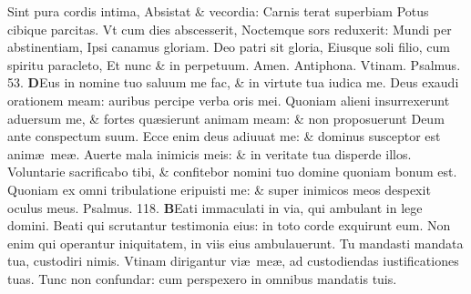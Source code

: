\documentclass[a5paper,10pt]{book}
\def\ae{æ}
\begin{document}
\begin{multicols*}{2}
\newline \color{red} S\color{black}int pura cordis intima, Absistat \& vecordia: Carnis terat superbiam Potus cibique parcitas.
\newline \color{red} V\color{black}t cum dies abscesserit, Noctemque sors reduxerit: Mundi per abstinentiam, Ipsi canamus gloriam.
\newline \color{red} D\color{black}eo patri sit gloria, Eiusque soli filio, cum spiritu paracleto, Et nunc \& in perpetuum. Amen.
\newline \color{red} Antiphona. \color{black} Vtinam. \color{red} Psalmus. \hypertarget{ps53}{53.} \color{black}
\vspace{-.25em}
\lettrine[lines=2]{\bfseries D}{}Eus in nomine tuo saluum me fac, \& in virtute tua iudica me.
\newline \color{red} D\color{black}eus exaudi orationem meam: auribus percipe verba oris mei.
\newline \color{red} Q\color{black}uoniam alieni insurrexerunt aduersum me, \& fortes qu\ae sierunt animam meam: \& non proposuerunt Deum ante conspectum suum.
\newline \color{red} E\color{black}cce enim deus adiuuat me: \& dominus susceptor est anim\ae \ me\ae .
\newline \color{red} A\color{black}uerte mala inimicis meis: \& in veritate tua disperde illos.
\newline \color{red} V\color{black}oluntarie sacrificabo tibi, \& confitebor nomini tuo domine quoniam bonum est.
\newline \color{red} Q\color{black}uoniam ex omni tribulatione eripuisti me: \& super inimicos meos despexit oculus meus. \quad \color{red} Psalmus. \hypertarget{ps118.1}{118.} \color{black}
\vspace{-.25em}
\lettrine[lines=2]{\bfseries \color{red} B}{}Eati immaculati in via, qui ambulant in lege domini.
\newline \color{red} B\color{black}eati qui scrutantur testimonia eius: in toto corde exquirunt eum.
\newline \color{red} N\color{black}on enim qui operantur iniquitatem, in viis eius ambulauerunt.
\newline \color{red} T\color{black}u mandasti mandata tua, custodiri nimis.
\newline \color{red} V\color{black}tinam dirigantur vi\ae \ me\ae , ad custodiendas iustificationes tuas.
\newline \color{red} T\color{black}unc non confundar: cum perspexero in omnibus mandatis tuis.

\end{multicols*}
\end{document}
